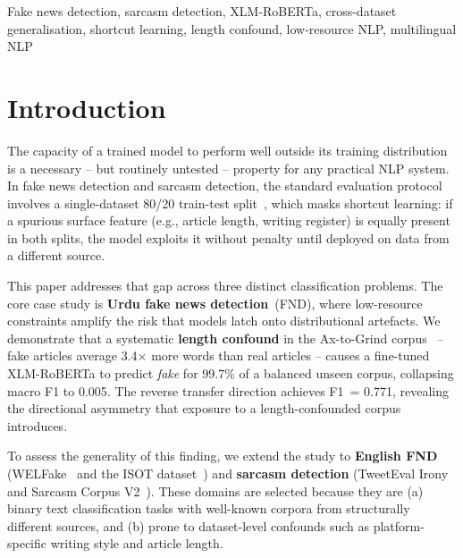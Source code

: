 \documentclass[conference]{IEEEtran}
\begin{document}
\begin{IEEEkeywords}
Fake news detection, sarcasm detection, XLM-RoBERTa, cross-dataset
generalisation, shortcut learning, length confound, low-resource NLP,
multilingual NLP
\end{IEEEkeywords}

\section{Introduction}
\label{sec:intro}

The capacity of a trained model to perform well outside its training
distribution is a necessary -- but routinely untested -- property for
any practical NLP system. In fake news detection and sarcasm
detection, the standard evaluation protocol involves a single-dataset
80/20 train-test split~\cite{zhou2020survey,amjad2020bend}, which
masks shortcut learning: if a spurious surface feature (e.g., article
length, writing register) is equally present in both splits, the model
exploits it without penalty until deployed on data from a different
source.

This paper addresses that gap across three distinct classification
problems. The core case study is \textbf{Urdu fake news
detection}~(FND), where low-resource constraints amplify the risk that
models latch onto distributional artefacts. We demonstrate that a
systematic \textbf{length confound} in the Ax-to-Grind
corpus~\cite{harris2024axtogrind} -- fake articles average
3.4$\times$ more words than real articles -- causes a fine-tuned
XLM-RoBERTa to predict \emph{fake} for 99.7\% of a balanced
unseen corpus, collapsing macro F1 to 0.005. The reverse transfer
direction achieves F1~= 0.771, revealing the directional
asymmetry that exposure to a length-confounded corpus introduces.

To assess the generality of this finding, we extend the study to
\textbf{English FND} (WELFake~\cite{verma2021welfake} and the
ISOT dataset~\cite{ahmed2018isot}) and \textbf{sarcasm detection}
(TweetEval Irony~\cite{vanhee2018semeval,barbieri2020tweeteval}
and Sarcasm Corpus V2~\cite{oraby2016sarcasm}). These domains are
selected because they are (a) binary text classification tasks with
well-known corpora from structurally different sources, and (b) prone
to dataset-level confounds such as platform-specific writing style and
article length.
\end{document}

